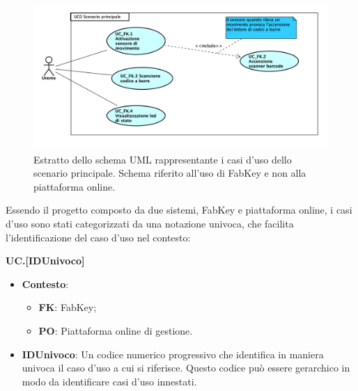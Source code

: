\begin{figure}[H]
	\begin{center}
	\includegraphics[scale=0.35]{immagini/usecase/scenario_principale.png}
	\caption{Estratto dello schema UML rappresentante i casi d'uso dello scenario principale. Schema riferito all'uso di FabKey e non alla piattaforma online.}
	\end{center}
\end{figure}

Essendo il progetto composto da due sistemi, FabKey e piattaforma online, i casi d'uso sono stati categorizzati da una notazione univoca, che facilita l'identificazione del caso d'uso nel contesto:

\begin{center}
\textbf{UC\textunderscore [Contesto].[IDUnivoco]}
\end{center}

\begin{itemize}
\item \textbf{Contesto}:
\begin{itemize}
\item \textbf{FK}: FabKey;
\item \textbf{PO}: Piattaforma online di gestione.
\end{itemize}

\item \textbf{IDUnivoco}: Un codice numerico progressivo che identifica in maniera univoca il caso d'uso a cui si riferisce. Questo codice può essere gerarchico in modo da identificare casi d'uso innestati.
\end{itemize}

